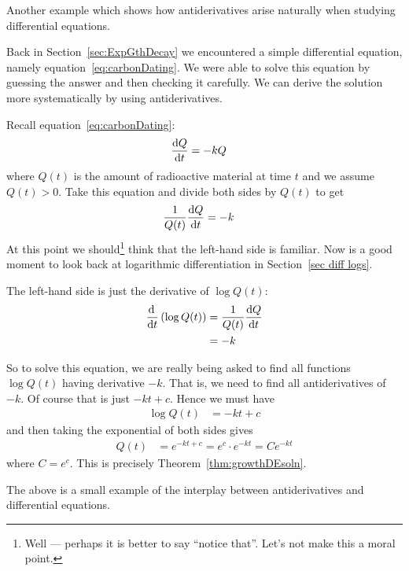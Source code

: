 Another example which shows how antiderivatives arise naturally when studying
differential equations.
\begin{eg}
Back in Section~\ref{sec:ExpGthDecay} we encountered a simple differential
equation, namely equation~\ref{eq:carbonDating}. We were able to solve this
equation by guessing the answer and then checking it carefully. We can derive
the solution more systematically by using antiderivatives.

Recall equation~\ref{eq:carbonDating}:
\begin{align*}
  \diff{Q}{t} &= -k Q
\end{align*}
where $Q(t)$ is the amount of radioactive material at time $t$ and we assume
$Q(t) > 0$. Take this equation and divide both sides by $Q(t)$ to get
\begin{align*}
  \frac{1}{Q(t)} \diff{Q}{t} &= -k
\end{align*}
At this point we should\footnote{Well --- perhaps it is better to say ``notice
that''. Let's not make this a moral point.} think that the left-hand side is
familiar. Now is a good moment to look back at logarithmic differentiation
in Section~\ref{sec diff logs}.

The left-hand side is just the derivative of $\log Q(t)$:
\begin{align*}
  \diff{}{t}\left( \log Q(t) \right) &= \frac{1}{Q(t)} \diff{Q}{t} \\
  &= -k
\end{align*}

So to solve this equation, we are really being asked to find all functions
$\log Q(t)$ having derivative $-k$. That is, we need to find  all
antiderivatives of $-k$. Of course that is just $-kt + c$. Hence we must have
\begin{align*}
  \log Q(t) &= -kt +c
\end{align*}
and then taking the exponential of both sides gives
\begin{align*}
  Q(t) &= e^{-kt+c} = e^c \cdot e^{-kt}  = C e^{-kt}
\end{align*}
where $C = e^c$. This is precisely Theorem~\ref{thm:growthDEsoln}.
\end{eg}
The above is a small example of the interplay between antiderivatives and
differential equations.

